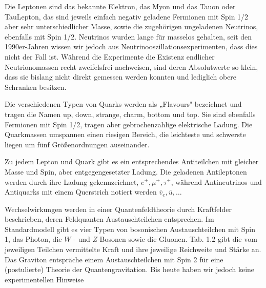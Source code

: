 \documentclass[10pt, letterpaper]{article}
\begin{document}
Die Leptonen sind das bekannte Elektron, das Myon und das Tauon oder TauLepton, das sind jeweils einfach negativ geladene Fermionen mit Spin 1/2 aber sehr unterschiedlicher Masse, sowie die zugehörigen ungeladenen Neutrinos, ebenfalls mit Spin 1/2. Neutrinos wurden lange für masselos gehalten, seit den 1990er-Jahren wissen wir jedoch aus Neutrinooszillationsexperimenten, dass dies nicht der Fall ist. Während die Experimente die Existenz endlicher Neutrionomassen recht zweifelsfrei nachweisen, sind deren Absolutwerte so klein, dass sie bislang nicht direkt gemessen werden konnten und lediglich obere Schranken besitzen.

Die verschiedenen Typen von Quarks werden als „Flavours" bezeichnet und tragen die Namen up, down, strange, charm, bottom und top. Sie sind ebenfalls Fermionen mit Spin 1/2, tragen aber gebrochenzahlige elektrische Ladung. Die Quarkmassen umspannen einen riesigen Bereich, die leichteste und schwerste liegen um fünf Größenordnungen auseinander.

Zu jedem Lepton und Quark gibt es ein entsprechendes Antiteilchen mit gleicher Masse und Spin, aber entgegengesetzter Ladung. Die geladenen Antileptonen werden durch ihre Ladung gekennzeichnet, $e^{+}, \mu^{+}, \tau^{+}$, während Antineutrinos und Antiquarks mit einem Querstrich notiert werden $\bar{v}_{e}, \bar{u}, \ldots$

Wechselwirkungen werden in einer Quantenfeldtheorie durch Kraftfelder beschrieben, deren Feldquanten Austauschteilchen entsprechen. Im Standardmodell gibt es vier Typen von bosonischen Austauschteilchen mit Spin 1, das Photon, die $W$ - und $Z$-Bosonen sowie die Gluonen. Tab. 1.2 gibt die vom jeweiligen Teilchen vermittelte Kraft und ihre jeweilige Reichweite und Stärke an. Das Graviton entspräche einem Austauschteilchen mit Spin 2 für eine (postulierte) Theorie der Quantengravitation. Bis heute haben wir jedoch keine experimentellen Hinweise
\end{document}
